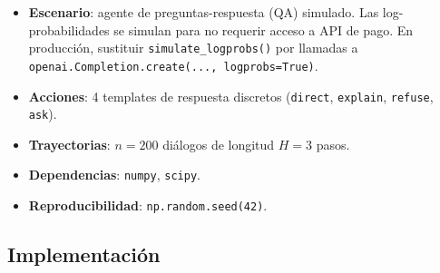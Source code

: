 \begin{itemize}
  \item \textbf{Escenario}: agente de preguntas-respuesta (QA) simulado.
    Las log-probabilidades se simulan para no requerir acceso a API de pago.
    En producción, sustituir \texttt{simulate\_logprobs()} por llamadas
    a \texttt{openai.Completion.create(..., logprobs=True)}.
  \item \textbf{Acciones}: 4 templates de respuesta discretos
    (\texttt{direct}, \texttt{explain}, \texttt{refuse}, \texttt{ask}).
  \item \textbf{Trayectorias}: $n=200$ diálogos de longitud $H=3$ pasos.
  \item \textbf{Dependencias}: \texttt{numpy}, \texttt{scipy}.
  \item \textbf{Reproducibilidad}: \texttt{np.random.seed(42)}.
\end{itemize}

\subsection*{Implementación}


